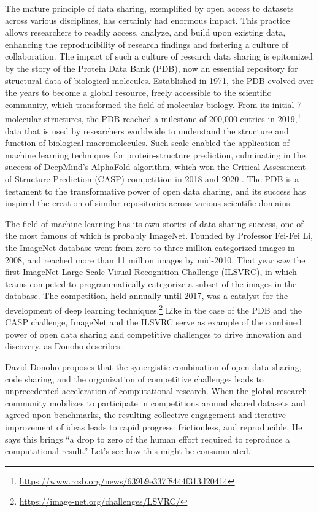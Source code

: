 \documentclass[]{hdsr}
\begin{document}
The mature principle of data sharing, exemplified by open access to datasets across various disciplines, has certainly had enormous impact. This practice allows researchers to readily access, analyze, and build upon existing data, enhancing the reproducibility of research findings and fostering a culture of collaboration.
The impact of such a culture of research data sharing is epitomized by the story of the Protein Data Bank (PDB), now an essential repository for structural data of biological molecules. Established in 1971, the PDB evolved over the years to become a global resource, freely accessible to the scientific community, which transformed the field of molecular biology. From its initial 7 molecular structures, the PDB reached a milestone of 200,000 entries in 2019,\footnote{\url{https://www.rcsb.org/news/639b9e337f8444f313d20414}} data that is used by researchers worldwide to understand the structure and function of biological macromolecules. Such scale enabled the application of machine learning techniques for protein-structure prediction, culminating in the success of DeepMind's AlphaFold algorithm, which won the Critical Assessment of Structure Prediction (CASP) competition in 2018 and 2020 \citep{jumper2021highly}. The PDB is a testament to the transformative power of open data sharing, and its success has inspired the creation of similar repositories across various scientific domains.

The field of machine learning has its own stories of data-sharing success, one of the most famous of which is probably ImageNet. Founded by Professor Fei-Fei Li, the ImageNet database went from zero to three million categorized images in 2008, and reached more than 11 million images by mid-2010. That year saw the first ImageNet Large Scale Visual Recognition Challenge (ILSVRC), in which teams competed to programmatically categorize a subset of the images in the database. The competition, held annually until 2017, was a catalyst for the development of deep learning techniques.\footnote{\url{https://image-net.org/challenges/LSVRC/}} Like in the case of the PDB and the CASP challenge, ImageNet and the ILSVRC serve as example of the combined power of open data sharing and competitive challenges to drive innovation and discovery, as Donoho describes.

David Donoho proposes that the synergistic combination of open data sharing, code sharing, and the organization of competitive challenges leads to unprecedented acceleration of computational research. When the global research community mobilizes to participate in competitions around shared datasets and agreed-upon benchmarks, the resulting collective engagement and iterative improvement of ideas leads to rapid progress: frictionless, and reproducible. He says this brings ``a drop to zero of the human effort required to reproduce a computational result.'' Let's see how this might be consummated.
\end{document}
